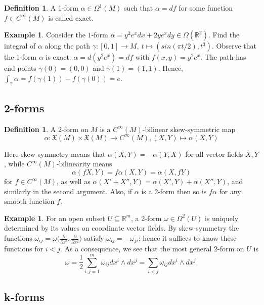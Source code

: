 \documentclass{article}
\theoremstyle{definition}
\newtheorem{defn}[theorem]{Definition}
\newtheorem{example}[theorem]{Example}
\newenvironment{definition}
  {\vspace{8pt}\begin{mdframed}[backgroundcolor=blueish]\begin{defn}}
  {\end{defn}\end{mdframed}\vspace{4pt}}
\begin{document}
\begin{definition}

A 1-form $\alpha \in \Omega^1(M)$ such that $\alpha = d f$ for some function $f \in C^\infty(M)$ is called exact.
\end{definition}

\begin{example}
Consider the $1$-form $\alpha = y^2 e^x dx+2y e^x dy \in \Omega(\mathbb R^2)$. Find the integral of $\alpha$ along the path $\gamma  : [0,1] \rightarrow M, \ t \mapsto (sin(\pi t/2),t^3 )$. Observe that the 1-form $\alpha$ is exact: $\alpha = d (y^2 e^x) = d f$ with $f(x, y) = y^2 e^x $. The path has end points $\gamma (0) = (0,0)$ and $\gamma (1) = (1,1)$. Hence, $\int_\gamma  \alpha = f(\gamma (1))- f(\gamma (0)) = e$.
\end{example}

\subsection{2-forms}
\begin{definition}
A 2-form on $M$ is a $C^\infty(M)$-bilinear skew-symmetric map 
\[
    \alpha : \mathfrak X(M)\times \mathfrak X(M) \rightarrow C^\infty (M), (X,Y) \mapsto \alpha (X,Y)
\]

Here skew-symmetry means that $\alpha(X,Y) = -\alpha(Y,X)$ for all vector fields $X,Y$, while $C^\infty(M)$-bilinearity means 
\[
\alpha(f X,Y) = f\alpha(X,Y) = \alpha(X, fY)
\] 
for $f \in C^\infty(M)$, as well as $\alpha(X' + X'' ,Y) = \alpha(X',Y) + \alpha(X'',Y)$, and similarly in the second argument. Also, if $\alpha$ is a 2-form then so is $f\alpha$ for any smooth function $f$.
\end{definition}

\begin{example}
For an open subset $U \subseteq \mathbb R^m$, a 2-form $\omega \in \Omega^2 (U)$ is uniquely determined by its values on coordinate vector fields. By skew-symmetry the functions $\omega_{i j} = \omega  \bigg ( \frac{\partial}{\partial  x^i} , \frac{\partial}{ \partial  x^j} \bigg )$ satisfy $\omega_{i j} = -\omega_{ji}$; hence it suffices to know these functions for $i < j$. As a consequence, we see that the most general 2-form on $U$ is 
\[
    \omega  = \frac{1}{2} \sum^m_{i, j=1} \omega_{i j} dx^i \wedge dx ^j = \sum_{i<j} \omega_{i j}dx^i \wedge dx^j.
\]

\end{example}

\subsection{k-forms}
\end{document}
